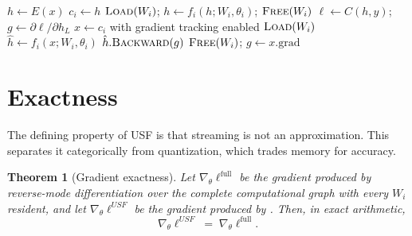 \documentclass[journal]{IEEEtran}
\newtheorem{theorem}{Theorem}
\newcommand{\usf}{USF}
\begin{document}
\begin{algorithm}[t]
\caption{\usf{} (batch-major, layer granularity)}
\label{alg:usf}
\begin{algorithmic}[1]
\State $h \gets E(x)$
 
    \State $c_i \gets h$ 
    \State $\textsc{Load}(W_i)$; \; $h \gets f_i(h; W_i, \theta_i)$; \; $\textsc{Free}(W_i)$
\EndFor
\State $\ell \gets C(h,y)$; \; $g \gets \partial\ell/\partial h_L$
 
    \State $x \gets c_i$ with gradient tracking enabled
    \State $\textsc{Load}(W_i)$
    \State $\hat h \gets f_i(x; W_i, \theta_i)$ 
    \State $\hat h.\textsc{Backward}(g)$ 
    \State $\textsc{Free}(W_i)$; \; $g \gets x.\mathrm{grad}$
\EndFor
\end{algorithmic}
\end{algorithm}

\section{Exactness}
\label{sec:exact}

The defining property of \usf{} is that streaming is not an approximation. This separates it
categorically from quantization, which trades memory for accuracy.

\begin{theorem}[Gradient exactness]
\label{thm:exact}
Let $\nabla_\theta \ell^{\mathrm{full}}$ be the gradient produced by reverse-mode differentiation
over the complete computational graph with every $W_i$ resident, and let
$\nabla_\theta \ell^{\usf}$ be the gradient produced by . Then, in exact arithmetic,
\begin{equation}
\nabla_\theta \ell^{\usf} \;=\; \nabla_\theta \ell^{\mathrm{full}} .
\end{equation}
\end{theorem}
\end{document}
